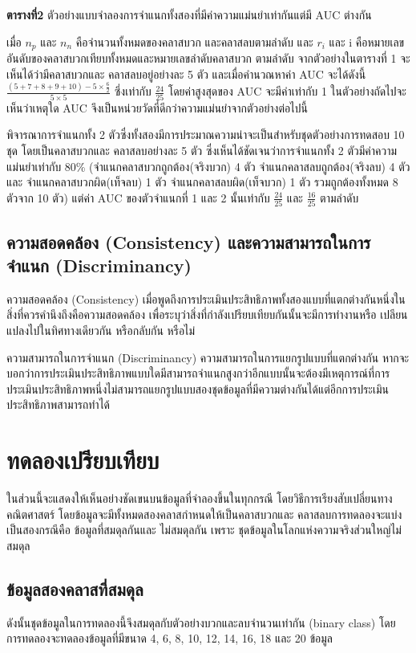 \documentclass[twoside, twocolumn, 12pt]{article}
\begin{document}
\begin{center} \textbf{ตารางที่2} ตัวอย่างแบบจำลองการจำแนกทั้งสองที่มีค่าความแม่นยำเท่ากันแต่มี AUC ต่างกัน \end{center}

เมื่อ $n_p$ และ $n_n$ คือจำนวนทั้งหมดของคลาสบวก และคลาสลบตามลำดับ และ $r_i$ และ i คือหมายเลขอันดับของคลาสบวกเทียบทั้งหมดและหมายเลขลำดับคลาสบวก ตามลำดับ จากตัวอย่างในตารางที่ 1 จะเห็นได้ว่ามีคลาสบวกและ คลาสลบอยู่อย่างละ 5 ตัว และเมื่อคำนวณหาค่า AUC จะได้ดังนี้ $\frac{(5+7+8+9+10)- 5\times\frac{6}{2}}{5\times5}$ ซึ่งเท่ากับ $\frac{24}{25}$ โดยค่าสูงสุดของ AUC จะมีค่าเท่ากับ 1 ในตัวอย่างถัดไปจะเห็นว่าเหตุใด AUC จึงเป็นหน่วยวัดที่ดีกว่าความแม่นยำจากตัวอย่างต่อไปนี้

พิจารณาการจำแนกทั้ง 2 ตัวซึ่งทั้งสองมีการประมาณความน่าจะเป็นสำหรับชุดตัวอย่างการทดสอบ 10 ชุด โดยเป็นคลาสบวกและ คลาสลบอย่างละ 5 ตัว ซึ่งเห็นได้ชัดเจนว่าการจำแนกทั้ง 2 ตัวมีค่าความแม่นยำเท่ากับ 80\% (จำแนกคลาสบวกถูกต้อง(จริงบวก) 4 ตัว จำแนกคลาสลบถูกต้อง(จริงลบ) 4 ตัวและ จำแนกคลาสบวกผิด(เท็จลบ) 1 ตัว จำแนกคลาสลบผิด(เท็จบวก) 1 ตัว รวมถูกต้องทั้งหมด 8 ตัวจาก 10 ตัว) แต่ค่า AUC ของตัวจำแนกที่ 1 และ 2 นั้นเท่ากับ $\frac{24}{25}$ และ $\frac{16}{25}$ ตามลำดับ

\subsection{ความสอดคล้อง (Consistency) และความสามารถในการจำแนก (Discriminancy)}
\quad ความสอดคล้อง (Consistency) เมื่อพูดถึงการประเมินประสิทธิภาพทั้งสองแบบที่แตกต่างกันหนึ่งในสิ่งที่ควรคำนึงถึงคือความสอดคล้อง เพื่อระบุว่าสิ่งที่กำลังเปรียบเทียบกันนั้นจะมีการทำงานหรือ เปลียนแปลงไปในทิศทางเดียวกัน หรือกลับกัน หรือไม่

ความสามารถในการจำแนก (Discriminancy) ความสามารถในการแยกรูปแบบที่แตกต่างกัน หากจะบอกว่าการประเมินประสิทธิภาพแบบใดมีสามารถจำแนกสูงกว่าอีกแบบนั้นจะต้องมีเหตุการณ์ที่การประเมินประสิทธิภาพหนึ่งไม่สามารถแยกรูปแบบสองชุดข้อมูลที่มีความต่างกันได้แต่อีกการประเมินประสิทธิภาพสามารถทำได้

\section{ทดลองเปรียบเทียบ}

\quad ในส่วนนี้จะแสดงให้เห็นอย่างชัดเขนบนข้อมูลที่จำลองขึ้นในทุกกรณี โดยวิธีการเรียงสับเปลี่ยนทางคณิตศาสตร์ โดยข้อมูลจะมีทั้งหมดสองคลาสกำหนดให้เป็นคลาสบวกและ คลาสลบการทดลองจะแบ่งเป็นสองกรณีคือ ข้อมูลที่สมดุลกันและ ไม่สมดุลกัน เพราะ ชุดข้อมูลในโลกแห่งความจริงส่วนใหญ่ไม่สมดุล
\subsection{ข้อมูลสองคลาสที่สมดุล}
\quad ดังนั้นชุดข้อมูลในการทดลองนี้จึงสมดุลกับตัวอย่างบวกและลบจำนวนเท่ากัน (binary class) โดยการทดลองจะทดลองข้อมูลที่มีขนาด 4, 6, 8, 10, 12, 14, 16, 18 และ 20 ข้อมูล
\end{document}
